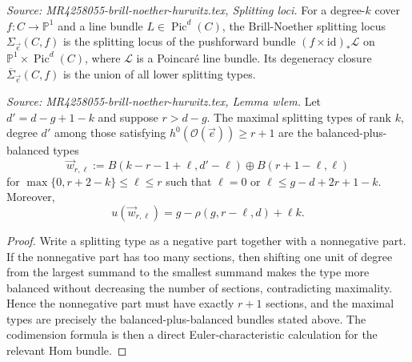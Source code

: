 \begin{definition}
  \label{def:bn-splitting-locus}
  \textit{Source: MR4258055-brill-noether-hurwitz.tex, Splitting loci.}
  For a degree-\(k\) cover \(f:C\to\mathbb P^1\) and a line bundle \(L\in\operatorname{Pic}^d(C)\), the Brill-Noether splitting locus \(\Sigma_{\vec e}(C,f)\) is the splitting locus of the pushforward bundle \((f\times\mathrm{id})_*\mathcal L\) on \(\mathbb P^1\times \operatorname{Pic}^d(C)\), where \(\mathcal L\) is a Poincar\'e line bundle. Its degeneracy closure \(\overline{\Sigma}_{\vec e}(C,f)\) is the union of all lower splitting types.
\end{definition}

\begin{lemma}
  \label{lem:wlem}
  \textit{Source: MR4258055-brill-noether-hurwitz.tex, Lemma wlem.}
  Let \(d' = d-g+1-k\) and suppose \(r > d-g\). The maximal splitting types of rank \(k\), degree \(d'\) among those satisfying \(h^0(\mathcal O(\vec e))\geq r+1\) are the balanced-plus-balanced types
  \[
  \vec w_{r,\ell} := B(k-r-1+\ell,d'-\ell)\oplus B(r+1-\ell,\ell)
  \]
  for \(\max\{0,r+2-k\}\leq \ell\leq r\) such that \(\ell=0\) or \(\ell\leq g-d+2r+1-k\). Moreover,
  \[
  u(\vec w_{r,\ell}) = g-\rho(g,r-\ell,d)+\ell k.
  \]
  \begin{proof}
    Write a splitting type as a negative part together with a nonnegative part. If the nonnegative part has too many sections, then shifting one unit of degree from the largest summand to the smallest summand makes the type more balanced without decreasing the number of sections, contradicting maximality. Hence the nonnegative part must have exactly \(r+1\) sections, and the maximal types are precisely the balanced-plus-balanced bundles stated above. The codimension formula is then a direct Euler-characteristic calculation for the relevant Hom bundle.
  \end{proof}
\end{lemma}

